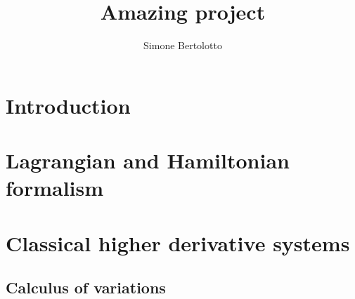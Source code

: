 \documentclass[a4paper]{article}
\title{Amazing project}
\author{Simone Bertolotto}
\theoremstyle{definition}
\numberwithin{equation}{section}
\begin{document}
  \maketitle

  \begin{abstract}
    \lipsum[1]
  \end{abstract}

  \newpage

  \section{Introduction}
  \label{section: introduction}
  

  \section{Lagrangian and Hamiltonian formalism}
  \label{section: lagrangin and hamiltonian formalism}
  

  \section{Classical higher derivative systems}
  \label{section: classical higher derivative systems}
  


  \newpage
  \begin{appendices}
    \section{Calculus of variations}
    \label{appendix: calculus of variation}
    
  \end{appendices}

  \newpage

  \printbibliography
\end{document}

